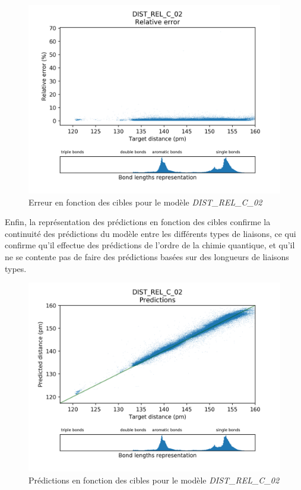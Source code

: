 \begin{figure}[!h]
	\centering
	
	\includegraphics[scale=0.7]{../figures/DIST_REL_C_02/DIST_REL_C_02_distrib_rmse_dist.png}	
	
	\caption{Erreur en fonction des cibles pour le modèle \emph{DIST\_REL\_C\_02}}
	\end{figure}

\par Enfin, la représentation des prédictions en fonction des cibles confirme la continuité des prédictions du modèle entre les différents types de liaisons, ce qui confirme qu'il effectue des prédictions de l'ordre de la chimie quantique, et qu'il ne se contente pas de faire des prédictions basées sur des longueurs de liaisons types.
\begin{figure}[!h]
	\centering
	
	\includegraphics[scale=0.7]{../figures/DIST_REL_C_02/DIST_REL_C_02_preds_targets.png}	
	
	\caption{Prédictions en fonction des cibles pour le modèle \emph{DIST\_REL\_C\_02}}
	
\end{figure}

